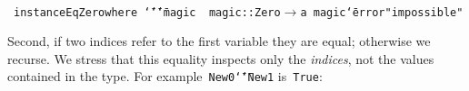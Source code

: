 \documentclass[9pt,authoryear]{sigplanconf}
\begin{document}
%
%
%
%
~\\~\vphantom{$\{$}\texttt{instance}\texttt{\mbox{\hspace{0.50em}}}\texttt{Eq}\texttt{\mbox{\hspace{0.50em}}}\texttt{Zero}\texttt{\mbox{\hspace{0.50em}}}\texttt{where}\texttt{{\nopagebreak \newline%
}\vphantom{$\{$}}\texttt{\mbox{\hspace{0.50em}}}\texttt{\mbox{\hspace{0.50em}}}\texttt{\makebox[1.22ex][l]{$ {(} $}}\texttt{{\char `\=}{\char `\=}}\texttt{\makebox[1.22ex][r]{$ {)} $}}\texttt{\mbox{\hspace{0.50em}}}\texttt{{\char `\=}}\texttt{\mbox{\hspace{0.50em}}}\texttt{magic}\texttt{{\nopagebreak \newline%
}\vphantom{$\{$}}\texttt{{\nopagebreak \newline%
}\vphantom{$\{$}}\texttt{magic}\texttt{\mbox{\hspace{0.50em}}}\texttt{{:}{:}}\texttt{\mbox{\hspace{0.50em}}}\texttt{Zero}\texttt{\mbox{\hspace{0.50em}}}\texttt{$ \rightarrow $}\texttt{\mbox{\hspace{0.50em}}}\texttt{a}\texttt{{\nopagebreak \newline%
}\vphantom{$\{$}}\texttt{magic}\texttt{\mbox{\hspace{0.50em}}}\texttt{\makebox[1.22ex][c]{\_{}}}\texttt{\mbox{\hspace{0.50em}}}\texttt{{\char `\=}}\texttt{\mbox{\hspace{0.50em}}}\texttt{error}\texttt{\mbox{\hspace{0.50em}}}\texttt{"impossible"}\texttt{{\nopagebreak \newline%
}\vphantom{$\{$}}%


%
Second, if two indices refer to the first variable they are equal;
    otherwise we recurse. We stress that this equality inspects only the
    \emph{indices}, not the values contained in the type. For
    example{~}\texttt{New}\texttt{\mbox{\hspace{0.50em}}}\texttt{0}\texttt{\mbox{\hspace{0.50em}}}\texttt{{\char `\=}{\char `\=}}\texttt{\mbox{\hspace{0.50em}}}\texttt{New}\texttt{\mbox{\hspace{0.50em}}}\texttt{1} is{~}\texttt{True}{:}%
\end{document}
